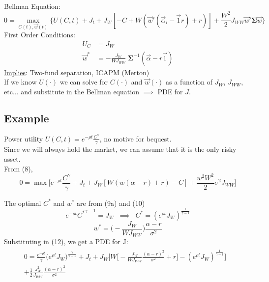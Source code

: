 \documentclass[
14pt,notheorems,hyperref={pdfauthor=whatever}
]{beamer}
\begin{document}
\begin{frame}
Bellman Equation:
\[ 0 = \max_{C(t),\vec{w}(t)} \Bigg\{ U(C,t)+J_t+J_W[-C+W(\vec{w}'(\vec{\alpha}_i-\vec{1}r)+r)] + \frac{W^2}{2} J_{WW} \vec{w}' \bm{\Sigma} \vec{w} \Bigg\} \]
First Order Conditions:
\begin{align*}
    U_C &= J_W\\
    \vec{w}^* &= -\frac{J_W}{W J_{WW}}\;\bm{\Sigma}^{-1}(\vec{\alpha}-r\vec{1})
\end{align*}
\underline{Implies}: Two-fund separation, ICAPM (Merton)\\
If we know $U(\cdot)$ we can solve for $C(\cdot)$ and $\vec{w}(\cdot)$ as a function of $J_W$, $J_{WW}$, etc... and substitute in the Bellman equation $\implies$ PDE for $J$.\\
\end{frame}

\subsection{Example}
\begin{frame}
Power utility $U(C,t) = e^{-\rho t}\frac{C^\gamma}{\gamma}$, no motive for bequest.\\
\hfill\break
Since we will always hold the market, we can assume that it is the only risky asset.\\
\hfill\break
From (8),
\begin{equation} \tag{12}
    0 = \max \Bigg[ e^{-\rho t}\frac{C^\gamma}{\gamma} + J_t + J_W[W(w(\alpha-r)+r)-C] + \frac{w^2W^2}{2}\sigma^2 J_{WW} \Bigg]
\end{equation}
\end{frame}

\begin{frame}
The optimal $C^*$ and $w^*$ are from (9a) and (10)\\
\[ e^{-\rho t}{C^*}^{\gamma-1} = J_W \;\;\implies\;\; C^* = (e^{\rho t}J_W)^{\frac{1}{\gamma-1}}\]
\[ w^* = \bigg(-\frac{J_W}{W J_{WW}}\bigg) \frac{\alpha-r}{\sigma^2} \]
Substituting in (12), we get a PDE for J:
\begin{align*}
\begin{split}
    0 = \frac{e^{-\rho t}}{\gamma} \bigg(e^{\rho t}J_W\bigg)^{\frac{\gamma}{\gamma-1}} + J_t + J_W\Bigg[ W\bigg[-\frac{J_W}{W J_{WW}}\frac{(\alpha-r)^2}{\sigma^2}+r\bigg] - (e^{\rho t}J_W)^{\frac{1}{\gamma-1}} \Bigg]&
    \\
    + \frac{1}{2}\frac{J_W^2}{J_{WW}} \frac{(\alpha-r)^2}{\sigma^2}&
\end{split}
\end{align*}
\end{frame}
\end{document}
